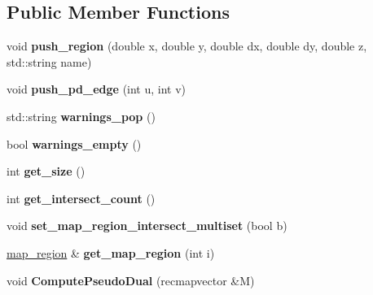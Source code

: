 \subsection*{Public Member Functions}
\begin{DoxyCompactItemize}
\item 
\mbox{\label{classcrecmap_1_1RecMap_af1bd7bf430ab5f013f0ae84af33bef6c}} 
void {\bfseries push\+\_\+region} (double x, double y, double dx, double dy, double z, std\+::string name)
\item 
\mbox{\label{classcrecmap_1_1RecMap_a5576e558dbfa122138db23b420ea2568}} 
void {\bfseries push\+\_\+pd\+\_\+edge} (int u, int v)
\item 
\mbox{\label{classcrecmap_1_1RecMap_a278f40f1df14d64df4c4a9cd5595da3b}} 
std\+::string {\bfseries warnings\+\_\+pop} ()
\item 
\mbox{\label{classcrecmap_1_1RecMap_a404641cf7fcf47dc32e101a823f6edb4}} 
bool {\bfseries warnings\+\_\+empty} ()
\item 
\mbox{\label{classcrecmap_1_1RecMap_a77f39e195bb75242aac9bccd910b1307}} 
int {\bfseries get\+\_\+size} ()
\item 
\mbox{\label{classcrecmap_1_1RecMap_a870136e4477ed8644ddc4a844f0b89f9}} 
int {\bfseries get\+\_\+intersect\+\_\+count} ()
\item 
\mbox{\label{classcrecmap_1_1RecMap_a1f49ea545a7c31e4740290a2f4472d1f}} 
void {\bfseries set\+\_\+map\+\_\+region\+\_\+intersect\+\_\+multiset} (bool b)
\item 
\mbox{\label{classcrecmap_1_1RecMap_a51c4a66b8b847749af400606b63940e9}} 
\hyperlink{structcrecmap_1_1map__region}{map\+\_\+region} \& {\bfseries get\+\_\+map\+\_\+region} (int i)
\item 
\mbox{\label{classcrecmap_1_1RecMap_a7284e0b346080f52476497c26ec61fd2}} 
void {\bfseries Compute\+Pseudo\+Dual} (recmapvector \&M)
\item 
\mbox{\label{classcrecmap_1_1RecMap_ac738bcd3b60e52e29e6855fdea17b230}} 

\end{DoxyCompactItemize}
